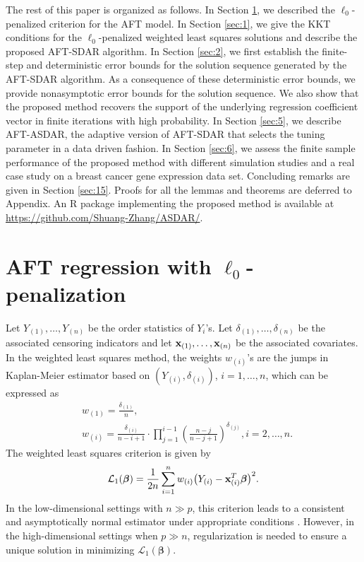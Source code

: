 \documentclass[12pt]{article}
\newcommand{\bx}{\mbox{\bf x}}
\newcommand{\bbeta}{\boldsymbol{\beta}}
\begin{document}
The rest of this paper is organized as follows. In Section \ref{AFT-L0},  we described the $\ell_0$-penalized criterion for the AFT model.
In Section \ref{sec:1},  we give the KKT conditions for the $\ell_0$-penalized weighted least squares solutions and describe the proposed AFT-SDAR algorithm.
In Section \ref{sec:2},  we first establish the finite-step and deterministic
error bounds for
the solution sequence generated by the AFT-SDAR algorithm.
As a consequence of these deterministic error bounds, we provide nonasymptotic error bounds for the solution sequence.
We also show that the proposed method recovers the support of the underlying regression coefficient vector in finite iterations with high probability.
In Section \ref{sec:5},  we describe
 AFT-ASDAR, the adaptive version of AFT-SDAR that selects the tuning parameter in a data driven fashion. In Section \ref{sec:6},  we assess the finite sample performance of the proposed method with different simulation studies and a real case study on a breast cancer gene expression data set.
 Concluding remarks are given in Section \ref{sec:15}. Proofs for all the lemmas and theorems are deferred to Appendix. {An R package implementing the proposed method is available at \url{https://github.com/Shuang-Zhang/ASDAR/}.}


\section{AFT regression with $\ell_0$-penalization}
\label{AFT-L0}

Let $Y_{(1)},\ldots,Y_{(n)}$ be the order statistics of $Y_i$'s. Let $\delta_{(1)},\ldots,\delta_{(n)}$  be the associated censoring indicators and let $\bx_{(1)},\ldots,\bx_{(n)}$ be the associated covariates.
In the weighted least squares method,
the weights $w_{(i)}$'s  are the jumps in Kaplan-Meier estimator based on
$(Y_{(i)}, \delta_{(i)})$, $i=1, \ldots, n$, which can be expressed as
\begin{equation}\label{wq}
\begin{split}
&w_{(1)}=\frac{\delta_{(1)}}{n},\\
&w_{(i)}=\frac{\delta_{(i)}}{n-i+1}\cdot\prod_{j=1}^{i-1}{\left(\frac{n-j}{n-j+1}\right)^{\delta_{(j)}}},i=2,\ldots,n.
\end{split}
\end{equation}
The weighted least squares criterion is given by
\begin{equation*}
{\mathcal L}_1(\bbeta)=
\frac{1}{2n}\sum_{i=1}^{n}
w_{(i)}\big{(}Y_{(i)}-\bx^{T}_{(i)}\bbeta\big{)}^2.
\end{equation*}
In the low-dimensional settings with $n \gg p$, this criterion leads to a consistent and asymptotically normal estimator under appropriate conditions %
\citep{stute1993strong,stute1996distributional}.
However, in the high-dimensional settings when $p \gg n$, regularization is needed to ensure a unique solution in
minimizing $\mathcal{L}_1(\bbeta)$.
\end{document}
